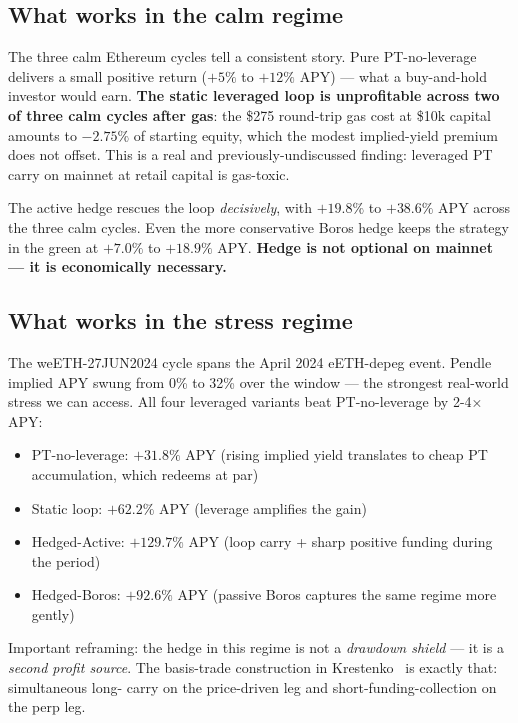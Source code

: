 \documentclass[11pt,a4paper]{article}
\begin{document}
\subsection{What works in the calm regime}

The three calm Ethereum cycles tell a consistent story.
Pure PT-no-leverage delivers a small positive return
(\(+5\%\) to \(+12\%\) APY) — what a buy-and-hold investor would
earn. \textbf{The static leveraged loop is unprofitable across
two of three calm cycles after gas}: the \$275 round-trip gas
cost at \$10k capital amounts to \(-2.75\%\) of starting equity,
which the modest implied-yield premium does not offset. This is
a real and previously-undiscussed finding: leveraged PT carry on
mainnet at retail capital is gas-toxic.

The active hedge rescues the loop \emph{decisively}, with
\(+19.8\%\) to \(+38.6\%\) APY across the three calm cycles.
Even the more conservative Boros hedge keeps the strategy in
the green at \(+7.0\%\) to \(+18.9\%\) APY. \textbf{Hedge is
not optional on mainnet — it is economically necessary.}

\subsection{What works in the stress regime}

The weETH-27JUN2024 cycle spans the April 2024 eETH-depeg event.
Pendle implied APY swung from 0\% to 32\% over the window —
the strongest real-world stress we can access. All four leveraged
variants beat PT-no-leverage by 2-4× APY:
\begin{itemize}[topsep=2pt,itemsep=0pt]
  \item PT-no-leverage: \(+31.8\%\) APY (rising implied yield
        translates to cheap PT accumulation, which redeems at par)
  \item Static loop: \(+62.2\%\) APY (leverage amplifies the gain)
  \item Hedged-Active: \(+129.7\%\) APY (loop carry + sharp
        positive funding during the period)
  \item Hedged-Boros: \(+92.6\%\) APY (passive Boros captures
        the same regime more gently)
\end{itemize}

Important reframing: the hedge in this regime is not a
\emph{drawdown shield} — it is a \emph{second profit source}.
The basis-trade construction in
Krestenko~\cite{krestenko2026} is exactly that: simultaneous long-
carry on the price-driven leg and short-funding-collection on the
perp leg.
\end{document}
